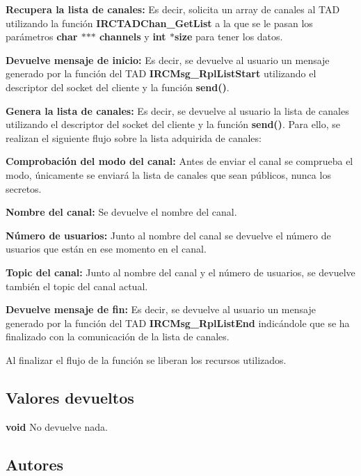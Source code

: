 \begin{DoxyItemize}
\item {\bfseries Recupera la lista de canales\+:} Es decir, solicita un array de canales al T\+A\+D utilizando la función {\bfseries I\+R\+C\+T\+A\+D\+Chan\+\_\+\+Get\+List} a la que se le pasan los parámetros {\bfseries char $\ast$$\ast$$\ast$ channels} y {\bfseries int $\ast$size} para tener los datos.  
\item {\bfseries Devuelve mensaje de inicio\+:} Es decir, se devuelve al usuario un mensaje generado por la función del T\+A\+D {\bfseries I\+R\+C\+Msg\+\_\+\+Rpl\+List\+Start} utilizando el descriptor del socket del cliente y la función {\bfseries send()}. 
\item {\bfseries Genera la lista de canales\+:} Es decir, se devuelve al usuario la lista de canales utilizando el descriptor del socket del cliente y la función {\bfseries send()}. Para ello, se realizan el siguiente flujo sobre la lista adquirida de canales\+: 
\begin{DoxyItemize}
\item {\bfseries Comprobación del modo del canal\+:} Antes de enviar el canal se comprueba el modo, únicamente se enviará la lista de canales que sean públicos, nunca los secretos. 
\item {\bfseries Nombre del canal\+:} Se devuelve el nombre del canal. 
\item {\bfseries Número de usuarios\+:} Junto al nombre del canal se devuelve el número de usuarios que están en ese momento en el canal. 
\item {\bfseries Topic del canal\+:} Junto al nombre del canal y el número de usuarios, se devuelve también el topic del canal actual. 
\end{DoxyItemize}
\item {\bfseries Devuelve mensaje de fin\+:} Es decir, se devuelve al usuario un mensaje generado por la función del T\+A\+D {\bfseries I\+R\+C\+Msg\+\_\+\+Rpl\+List\+End} indicándole que se ha finalizado con la comunicación de la lista de canales. 
\end{DoxyItemize}

Al finalizar el flujo de la función se liberan los recursos utilizados.\hypertarget{server_command_list_return_list}{}\subsection{Valores devueltos}\label{server_command_list_return_list}

\begin{DoxyItemize}
\item {\bfseries void} No devuelve nada. 
\end{DoxyItemize}\hypertarget{server_command_list_authors_list}{}\subsection{Autores}\label{server_command_list_authors_list}

